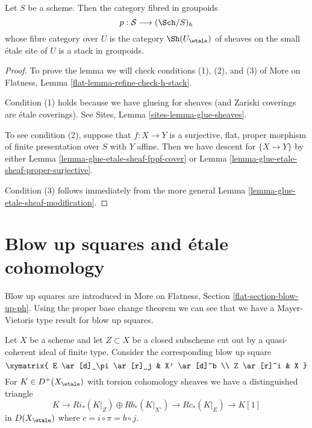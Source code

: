 \begin{lemma}
\label{lemma-h-descent-etale-sheaves}
Let $S$ be a scheme. Then the category fibred in groupoids
$$
p : \mathcal{S} \longrightarrow (\Sch/S)_h
$$
whose fibre category over $U$ is the category $\Sh(U_\etale)$
of sheaves on the small \'etale site of $U$ is a stack in groupoids.
\end{lemma}

\begin{proof}
To prove the lemma we will check conditions (1), (2), and (3) of
More on Flatness, Lemma \ref{flat-lemma-refine-check-h-stack}.

\medskip\noindent
Condition (1) holds because we have glueing for sheaves (and
Zariski coverings are \'etale coverings). See
Sites, Lemma \ref{sites-lemma-glue-sheaves}.

\medskip\noindent
To see condition (2), suppose that $f : X \to Y$ is a surjective,
flat, proper morphism of finite presentation over $S$ with $Y$ affine.
Then we have descent for $\{X \to Y\}$ by either
Lemma \ref{lemma-glue-etale-sheaf-fppf-cover} or
Lemma \ref{lemma-glue-etale-sheaf-proper-surjective}.

\medskip\noindent
Condition (3) follows immediately from the more general
Lemma \ref{lemma-glue-etale-sheaf-modification}.
\end{proof}



















\section{Blow up squares and \'etale cohomology}
\label{section-blow-up-square}

\noindent
Blow up squares are introduced in
More on Flatness, Section \ref{flat-section-blow-up-ph}.
Using the proper base change theorem we can see that
we have a Mayer-Vietoris type result for blow up squares.

\begin{lemma}
\label{lemma-blow-up-square-cohomological-descent}
Let $X$ be a scheme and let $Z \subset X$ be a closed subscheme
cut out by a quasi-coherent ideal of finite type. Consider the
corresponding blow up square
$$
\xymatrix{
E \ar[d]_\pi \ar[r]_j & X' \ar[d]^b \\
Z \ar[r]^i & X
}
$$
For $K \in D^+(X_\etale)$ with torsion cohomology sheaves
we have a distinguished triangle
$$
K \to Ri_*(K|_Z) \oplus Rb_*(K|_{X'}) \to Rc_*(K|_E) \to K[1]
$$
in $D(X_\etale)$ where $c = i \circ \pi = b \circ j$.
\end{lemma}

